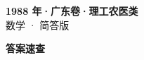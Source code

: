 \documentclass[zihao=-4, a4paper]{ctexart}
\begin{document}
\begin{center}
  {\Large\bfseries 1988 年·广东卷·理工农医类}\\[4pt]
  {\large 数学 · 简答版}
\end{center}
\medskip
{}

\clearpage
{}
\begin{center}{\Large\bfseries 答案速查}\end{center}
\medskip

\end{document}
